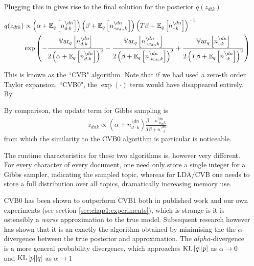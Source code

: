 Plugging this in gives rise to the final solution for the posterior $q(z_{dtk})$

{\small
\begin{align}
\begin{split}
q(z_{dtk}) & \propto
\left(\alpha + \ex{n_{d\cdot k}^{\setminus dn}}{q}\right)
\left(\beta + \ex{n_{\cdot w_{dn} k}^{\setminus dn}}{q}\right)
\invb{T \beta + \ex{n_{\cdot \cdot k}^{\setminus dn}}{q}}\\
&\exp\left(
    -\frac{
        \var{n_{d\cdot k}^{\setminus dn}}{q}
    } {
    2 \left(\alpha + \ex{n_{d\cdot k}^{\setminus dn}}{q}\right)^2
    }
    -\frac{
        \var{n_{\cdot w_{dn} k}^{\setminus dn}}{q}
    } {
    2 \left(\beta + \ex{n_{\cdot w_{dn} k}^{\setminus dn}}{q}\right)^2
    }
    +\frac{
        \var{n_{\cdot \cdot k}^{\setminus dn}}{q}
    } {
    2 \left(T \beta + \ex{n_{\cdot \cdot k}^{\setminus dn}}{q}\right)^2
    }
\right)
\end{split}\label{eqn:lda-cvb-update}
\end{align}
}


This is known as the ``CVB" algorithm. Note that if we had used a zero-th order Taylor expansion, ``CVB0", the $\exp(\cdot)$ term would have disappeared entirely. By

By comparison, the update term for Gibbs sampling is 
\begin{align}
z_{dnk} \propto 
\left(\alpha + n_{d\cdot k}^{\setminus dn}\right)
\frac{
        \beta + n_{\cdot w_{dn} k}^{\setminus dn}
     } {
        T \beta + n_{\cdot \cdot k}^{\setminus dn}
    }\label{eqn:lda-gibbs-update}
\end{align}
from which the similarity to the CVB0 algorithm is particular is noticeable.

The runtime characteristics for these two algorithms is, however very different. For every character of every document, one need only store a single integer for a Gibbs sampler, indicating the sampled topic, whereas for LDA/CVB one needs to store a full distribution over all topics, dramatically increasing memory use.

CVB0 has been shown to outperform CVB1 both in published work\cite{Asuncion2012}\cite{Teh2007} and our own experiments (see section \ref{sec:chap1:experiments}), which is strange is it is ostensibly a \emph{worse} approximation to the true model. Subsequent research\cite{Sato2012} however has shown that it is an exactly the algorithm obtained by minimising the the $\alpha$-divergence between the true posterior and approximation. The $alpha$-divergence is a more general probability divergence, which approaches $\kl{q}{p}$ as $\alpha \rightarrow 0$ and $\kl{p}{q}$ as $\alpha \rightarrow 1$

